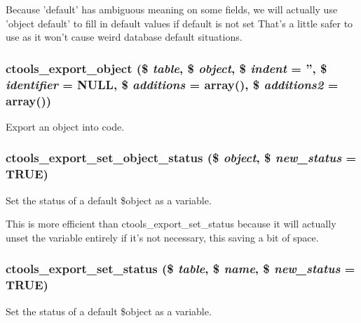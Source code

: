 Because 'default' has ambiguous meaning on some fields, we will actually use 'object default' to fill in default values if default is not set That's a little safer to use as it won't cause weird database default situations. \hypertarget{export_8inc_a70df7f4160524363096623f41967a180}{
\subsubsection[{ctools\_\-export\_\-object}]{\setlength{\rightskip}{0pt plus 5cm}ctools\_\-export\_\-object (\$ {\em table}, \/  \$ {\em object}, \/  \$ {\em indent} = {\ttfamily ''}, \/  \$ {\em identifier} = {\ttfamily NULL}, \/  \$ {\em additions} = {\ttfamily array()}, \/  \$ {\em additions2} = {\ttfamily array()})}}
\label{export_8inc_a70df7f4160524363096623f41967a180}
Export an object into code. \hypertarget{export_8inc_a525db1d7117ac82873783e9e5e5f1ad0}{
\subsubsection[{ctools\_\-export\_\-set\_\-object\_\-status}]{\setlength{\rightskip}{0pt plus 5cm}ctools\_\-export\_\-set\_\-object\_\-status (\$ {\em object}, \/  \$ {\em new\_\-status} = {\ttfamily TRUE})}}
\label{export_8inc_a525db1d7117ac82873783e9e5e5f1ad0}
Set the status of a default \$object as a variable.

This is more efficient than ctools\_\-export\_\-set\_\-status because it will actually unset the variable entirely if it's not necessary, this saving a bit of space. \hypertarget{export_8inc_a310cf49738fe8143e3e164e8de811b8c}{
\subsubsection[{ctools\_\-export\_\-set\_\-status}]{\setlength{\rightskip}{0pt plus 5cm}ctools\_\-export\_\-set\_\-status (\$ {\em table}, \/  \$ {\em name}, \/  \$ {\em new\_\-status} = {\ttfamily TRUE})}}
\label{export_8inc_a310cf49738fe8143e3e164e8de811b8c}
Set the status of a default \$object as a variable.

